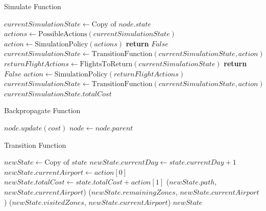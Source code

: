 \begin{algorithm}[H]
    \caption{Simulate Function}
    \label{alg:Simulate}
    \begin{algorithmic}[1]
        \STATE $currentSimulationState \leftarrow \text{Copy of } node.state$
        \STATE $actions \leftarrow \text{PossibleActions}(currentSimulationState)$
        \STATE $action \leftarrow \text{SimulationPolicy}(actions)$
        \STATE \textbf{return} $False$
        \ENDIF
        \STATE $currentSimulationState \leftarrow \text{TransitionFunction}(currentSimulationState, action)$
        \ENDWHILE
        \STATE $returnFlightActions \leftarrow \text{FlightsToReturn}(currentSimulationState)$
        \STATE \textbf{return} $False$
        \ENDIF
        \STATE $action \leftarrow \text{SimulationPolicy}(returnFlightActions)$
        \STATE $currentSimulationState \leftarrow \text{TransitionFunction}(currentSimulationState, action)$
        \ENDIF
        \RETURN $currentSimulationState.totalCost$
    \end{algorithmic}
\end{algorithm}

\begin{algorithm}[H]
    \caption{Backpropagate Function}
    \label{alg:Backpropagate}
    \begin{algorithmic}[1]
        \STATE $node.update(cost)$
        \STATE $node \leftarrow node.parent$
        \ENDWHILE
    \end{algorithmic}
\end{algorithm}

\begin{algorithm}[H]
    \caption{Transition Function}
    \label{alg:TransitionFunction}
    \begin{algorithmic}[1]
        \STATE $newState \leftarrow \text{Copy of } state$
        \STATE $newState.currentDay \leftarrow state.currentDay + 1$
        \STATE $newState.currentAirport \leftarrow action[0]$
        \STATE $newState.totalCost \leftarrow state.totalCost + action[1]$
        \STATE {}($newState.path$, $newState.currentAirport$)
        \STATE {}($newState.remainingZones$, $newState.currentAirport$)
        \STATE {}($newState.visitedZones$, $newState.currentAirport$)
        \RETURN $newState$
    \end{algorithmic}
\end{algorithm}

